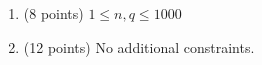 \begin{enumerate}
    \tightlist
    \item (8 points) $1 \leq n, q \leq 1000$
    \item (12 points) No additional constraints.
\end{enumerate}
    